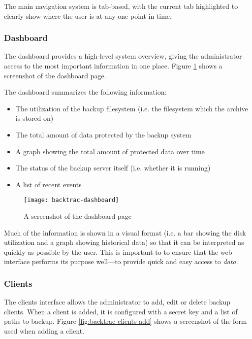 The main navigation system is tab-based, with the current tab highlighted to
clearly show where the user is at any one point in time.

\subsubsection{Dashboard}
\label{sec:implementation-web-dashboard}

The dashboard provides a high-level system overview, giving the administrator
access to the most important information in one place. Figure
\ref{fig:backtrac-dashboard} shows a screenshot of the dashboard page.

The dashboard summarizes the following information:

\begin{itemize}
    \item The utilization of the backup filesystem (i.e. the filesystem which
        the archive is stored on)
    \item The total amount of data protected by the backup system
    \item A graph showing the total amount of protected data over time
    \item The status of the backup server itself (i.e. whether it is running)
    \item A list of recent events
\end{itemize}

\begin{figure}
    \begin{center}
        \texttt{[image: backtrac-dashboard]}
    \end{center}
    \caption{A screenshot of the dashboard page}
    \label{fig:backtrac-dashboard}
\end{figure}

Much of the information is shown in a visual format (i.e. a bar showing the
disk utilization and a graph showing historical data) so that it can be
interpreted as quickly as possible by the user. This is important to to ensure
that the web interface performs its purpose well---to provide quick and easy
access to \emph{data}.

\subsubsection{Clients}
\label{sec:implementation-web-clients}

The clients interface allows the administrator to add, edit or delete backup
clients. When a client is added, it is configured with a secret key and a list
of paths to backup. Figure \ref{fig:backtrac-clients-add} shows a screenshot of
the form used when adding a client.

